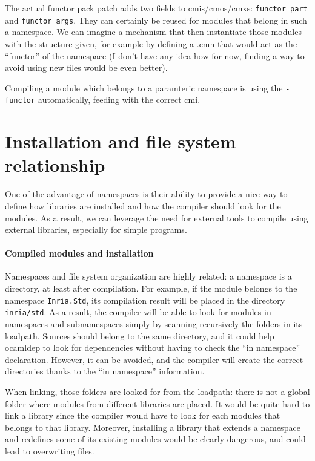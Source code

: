 \documentclass[11pt,a4paper]{article}
\begin{document}
The actual functor pack patch adds two fields to cmis/cmos/cmxs:
\lstinline{functor_part} and \lstinline{functor_args}. They can certainly be
reused for modules that belong in such a namespace. We can imagine a mechanism
that then instantiate those modules with the structure given, for example by
defining a .cmn that would act as the ``functor'' of the namespace (I don't have
any idea how for now, finding a way to avoid using new files would be even better).

Compiling a module which belongs to a paramteric namespace is using the
\lstinline{-functor} automatically, feeding with the correct cmi. 

\section{Installation and file system relationship}

One of the advantage of namespaces is their ability to provide a nice way to
define how libraries are installed and how the compiler should look for the
modules. As a result, we can leverage the need for external tools to compile
using external libraries, especially for simple programs.

\paragraph{Compiled modules and installation}

Namespaces and file system organization are highly related: a namespace is a
directory, at least after compilation. For example, if the module belongs to the
namespace \texttt{Inria.Std}, its compilation result will be placed in the
directory \texttt{inria/std}. As a result, the compiler will be able to look for
modules in namespaces and subnamespaces simply by scanning recursively the
folders in its loadpath. Sources should belong to the same directory, and it
could help ocamldep to look for dependencies without having to check the ``in
namespace'' declaration. However, it can be avoided, and the compiler will
create the correct directories thanks to the ``in namespace'' information.

When linking, those folders are looked for from the loadpath: there is not a
global folder where modules from different libraries are placed. It would be
quite hard to link a library since the compiler would have to look for each
modules that belongs to that library. Moreover, installing a library that
extends a namespace and redefines some of its existing modules would be clearly
dangerous, and could lead to overwriting files.
\end{document}
